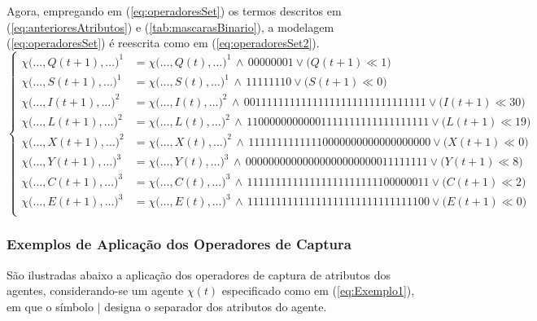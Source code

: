 Agora, empregando em (\ref{eq:operadoresSet}) os termos descritos em (\ref{eq:anterioresAtributos}) e (\ref{tab:mascarasBinario}), a modelagem (\ref{eq:operadoresSet}) é reescrita como em (\ref{eq:operadoresSet2}).
\begin{equation}
 \begin{cases} 
 \chi\big(\dotsc, Q(t + 1), \dotsc \big)^1 	& = \chi\big(\dotsc, Q(t), \dotsc \big)^1 \, \wedge \, 00000001 \vee \big(Q(t + 1) \ll 1\big) \\  
 \chi\big(\dotsc, S(t + 1), \dotsc \big)^1	& = \chi\big(\dotsc, S(t), \dotsc \big)^1 \, \wedge \, 11111110 \vee \big(S(t + 1) \ll 0\big) \\   
 
 \chi\big(\dotsc, I(t + 1), \dotsc \big)^2 	& = \chi\big(\dotsc, I(t), \dotsc \big)^2 \, \wedge \, 00111111111111111111111111111111 \vee \big(I(t + 1) \ll 30\big) \\  
 \chi\big(\dotsc, L(t + 1), \dotsc \big)^2 	& = \chi\big(\dotsc, L(t), \dotsc \big)^2 \, \wedge \, 11000000000001111111111111111111 \vee \big(L(t + 1) \ll 19\big) \\  
 \chi\big(\dotsc, X(t + 1), \dotsc \big)^2 	& = \chi\big(\dotsc, X(t), \dotsc \big)^2 \, \wedge \, 11111111111110000000000000000000 \vee \big(X(t + 1) \ll 0\big) \\  
 
 \chi\big(\dotsc, Y(t + 1), \dotsc \big)^3 	& = \chi\big(\dotsc, Y(t), \dotsc \big)^3 \, \wedge \, 00000000000000000000000011111111 \vee \big(Y(t + 1) \ll 8\big) \\   
 \chi\big(\dotsc, C(t + 1), \dotsc \big)^3 	& = \chi\big(\dotsc, C(t), \dotsc \big)^3 \, \wedge \, 11111111111111111111111100000011 \vee \big(C(t + 1) \ll 2\big) \\  
 \chi\big(\dotsc, E(t + 1), \dotsc \big)^3 	& = \chi\big(\dotsc, E(t), \dotsc \big)^3 \, \wedge \, 11111111111111111111111111111100 \vee \big(E(t + 1) \ll 0\big) \\
 \end{cases}
 \label{eq:operadoresSet2}
\end{equation}

\newpage

\subsubsection{Exemplos de Aplicação dos Operadores de Captura}

São ilustradas abaixo a aplicação dos operadores de captura de atributos dos agentes, considerando-se um agente $\chi(t)$ especificado como em (\ref{eq:Exemplo1}), em que o símbolo $|$ designa o separador dos atributos do agente. 

